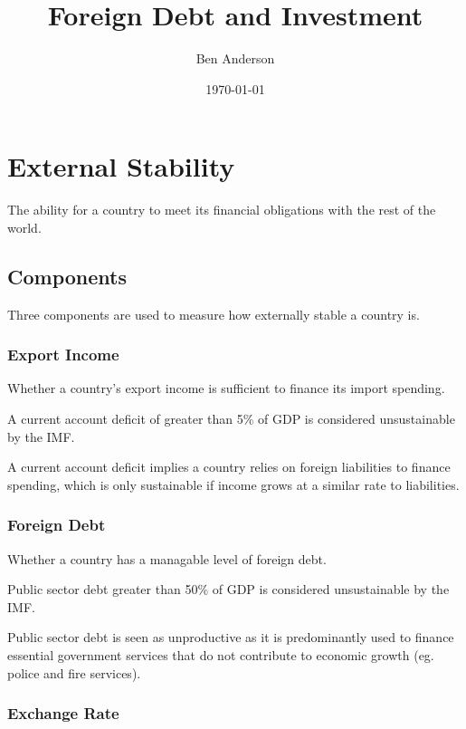 \documentclass[a4paper,11pt]{article}
\begin{document}
\title{Foreign Debt and Investment}
\author{Ben Anderson}
\date{\today}
\maketitle
\pagebreak

\tableofcontents
\pagebreak


\section{External Stability}

The ability for a country to meet its financial obligations with the rest of
the world.


\subsection{Components}

Three components are used to measure how externally stable a country is.


\subsubsection{Export Income}

Whether a country's export income is sufficient to finance its import spending.

A current account deficit of greater than 5\% of GDP is considered
unsustainable by the IMF.

A current account deficit implies a country relies on foreign liabilities to
finance spending, which is only sustainable if income grows at a similar rate
to liabilities.


\subsubsection{Foreign Debt}

Whether a country has a managable level of foreign debt.

Public sector debt greater than 50\% of GDP is considered unsustainable by the
IMF.

Public sector debt is seen as unproductive as it is predominantly used to
finance essential government services that do not contribute to economic
growth (eg. police and fire services).


\subsubsection{Exchange Rate}
\end{document}
